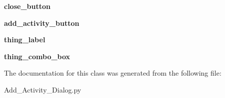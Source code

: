 \begin{DoxyCompactItemize}
\item 
\hypertarget{classAdd__Activity__Dialog_1_1Ui__Add__Activity__Dialog_aedcfb85907502877643a1fc5e0aa0c86}{{\bfseries close\-\_\-button}}\label{classAdd__Activity__Dialog_1_1Ui__Add__Activity__Dialog_aedcfb85907502877643a1fc5e0aa0c86}

\item 
\hypertarget{classAdd__Activity__Dialog_1_1Ui__Add__Activity__Dialog_a20737594a903f5a6408906acdf606aca}{{\bfseries add\-\_\-activity\-\_\-button}}\label{classAdd__Activity__Dialog_1_1Ui__Add__Activity__Dialog_a20737594a903f5a6408906acdf606aca}

\item 
\hypertarget{classAdd__Activity__Dialog_1_1Ui__Add__Activity__Dialog_ab4b9edc3fbf12f78e73d45cc50647d1f}{{\bfseries thing\-\_\-label}}\label{classAdd__Activity__Dialog_1_1Ui__Add__Activity__Dialog_ab4b9edc3fbf12f78e73d45cc50647d1f}

\item 
\hypertarget{classAdd__Activity__Dialog_1_1Ui__Add__Activity__Dialog_aa3b9428365c11d3ad94cea9afb1615d9}{{\bfseries thing\-\_\-combo\-\_\-box}}\label{classAdd__Activity__Dialog_1_1Ui__Add__Activity__Dialog_aa3b9428365c11d3ad94cea9afb1615d9}

\end{DoxyCompactItemize}


The documentation for this class was generated from the following file\-:\begin{DoxyCompactItemize}
\item 
Add\-\_\-\-Activity\-\_\-\-Dialog.\-py\end{DoxyCompactItemize}
